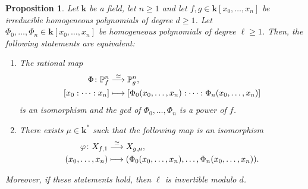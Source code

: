\documentclass[JEP,XML,SOM,Unicode,NoFloatCountersInSection,published]{cedram}
\newcommand\mto{\mathchoice{\longmapsto}{\mapsto}{\mapsto}{\mapsto}}
\newtheorem{proposition}[lemma]{Proposition}
\theoremstyle{definition}
\newcommand\iso{\stackrel{\simeq}{\longrightarrow}}
\renewcommand\k{{\mathbf k}}
\newcommand\p{{\mathbb P}}\let\PP\p
\newcommand{\kk}{\mathbf{k}}
\begin{document}
\begin{proposition}
\label{Prop.cyclic_covering}
Let $\kk$ be a field, let $n \geq 1$ and let $f,g\in \k[x_0,\ldots,x_n]$ be irreducible homogeneous polynomials
of degree $d \ge 1$. Let $\Phi_0,\ldots,\Phi_n\in \k[x_0,\ldots,x_n]$ be homogeneous polynomials of degree $\ell\ge 1$.
Then, the following statements are equivalent:
\begin{enumerate}
\item\label{cyclic_covering1} The rational map
\begin{align*}
\Phi\colon \p^n_f & \iso  \p^n_g, \\
{[x_0:\cdots:x_n]} & \mto  [\Phi_0(x_0,\ldots,x_n):\cdots: \Phi_n(x_0,\ldots,x_n)]
\end{align*}
is an isomorphism and the gcd of $\Phi_0, \ldots, \Phi_n$ is a power of $f$.
\item\label{cyclic_covering2}There exists $\mu\in \k^*$ such that the following map is an isomorphism
\begin{align*}
\varphi\colon X_{f,1} & \iso X_{g,\mu}, \\
(x_0,\ldots,x_n) & \mto (\Phi_0(x_0,\ldots,x_n),\ldots, \Phi_n(x_0,\ldots,x_n)).
\end{align*}
\end{enumerate}
Moreover, if these statements hold, then $\ell$ is invertible modulo $d$.
\end{proposition}
\end{document}
